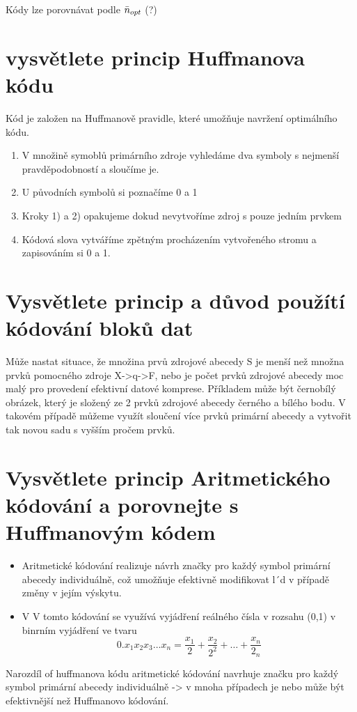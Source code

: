 Kódy lze porovnávat podle $\Bar{n}_{opt}$ (?)

\section{vysvětlete princip Huffmanova kódu}
Kód je založen na Huffmanově pravidle, které umožňuje navržení optimálního kódu.

\begin{enumerate}
    \item V množině symoblů primárního zdroje vyhledáme dva symboly s nejmenší pravděpodobností a sloučíme je.
    \item U původních symbolů si poznačíme 0 a 1
    \item Kroky 1) a 2) opakujeme dokud nevytvoříme zdroj s pouze jedním prvkem
    \item Kódová slova vytváříme zpětným procházením vytvořeného stromu a zapisováním si 0 a 1.
\end{enumerate}

\section{Vysvětlete princip a důvod použítí kódování bloků dat}
Může nastat situace, že množina prvů zdrojové abecedy S je menší než množna prvků pomocného zdroje X->q->F, nebo je počet prvků zdrojové abecedy moc malý pro provedení efektivní datové komprese.
Příkladem může být černobílý obrázek, který je složený ze 2 prvků zdrojové abecedy černého a bílého bodu.
V takovém případě můžeme využít sloučení více prvků primární abecedy a vytvořit tak novou sadu s vyšším pročem prvků.

\section{Vysvětlete princip Aritmetického kódování a porovnejte s Huffmanovým kódem}
\begin{itemize}
    \item Aritmetické kódování realizuje návrh značky pro každý symbol primární abecedy individuálně, což umožňuje efektivně modifikovat l´d v případě změny v jejím výskytu.
    \item V V tomto kódování se využívá vyjádření reálného čísla v rozsahu (0,1) v binrním vyjádření ve tvaru
    $$0.x_1x_2x_3\dots x_n=\frac{x_1}{2}+\frac{x_2}{2^2}+\dots+\frac{x_n}{2_n}$$
\end{itemize}
Narozdíl of huffmanova kódu aritmetické kódování navrhuje značku pro každý symbol primární abecedy individuálně -> v mnoha případech je nebo může být efektivnější než Huffmanovo kódování.

